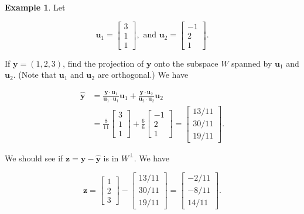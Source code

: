 \documentclass[
]{book}
\theoremstyle{definition}
\theoremstyle{definition}
\newtheorem{example}{Example}[chapter]
\theoremstyle{definition}
\theoremstyle{definition}
\theoremstyle{remark}
\begin{document}
\begin{examplebox}

\begin{example}
Let

\[\mathbf{u}_1=\begin{bmatrix}3\\1\\1\end{bmatrix},\text{ and } \mathbf{u}_2=\begin{bmatrix}-1\\2\\1\end{bmatrix}.\]

If \(\mathbf{y}=(1,2,3)\), find the projection of \(\mathbf{y}\) onto the subspace \(W\) spanned by \(\mathbf{u}_1\) and \(\mathbf{u}_2\). (Note that \(\mathbf{u}_1\) and \(\mathbf{u}_2\) are orthogonal.) We have

\begin{align*} 
\hat{\mathbf{y}}&=\frac{\mathbf{y}\cdot\mathbf{u}_1}{\mathbf{u}_1\cdot \mathbf{u}_1}\mathbf{u}_1+\frac{\mathbf{y}\cdot\mathbf{u}_2}{\mathbf{u}_2\cdot \mathbf{u}_2}\mathbf{u}_2\\
&=\frac{8}{11}\begin{bmatrix}3\\1\\1\end{bmatrix}+\frac{6}{6}\begin{bmatrix}-1\\2\\1\end{bmatrix}=\begin{bmatrix}13/11\\30/11\\19/11\end{bmatrix}.
\end{align*}

We should see if \(\mathbf{z}=\mathbf{y}-\hat{\mathbf{y}}\) is in \(W^\perp\). We have

\[\mathbf{z}=\begin{bmatrix}1\\2\\3\end{bmatrix}-\begin{bmatrix}13/11\\30/11\\19/11\end{bmatrix}=\begin{bmatrix}-2/11\\-8/11\\14/11\end{bmatrix}.\]


\end{example}
\end{examplebox}
\end{document}
